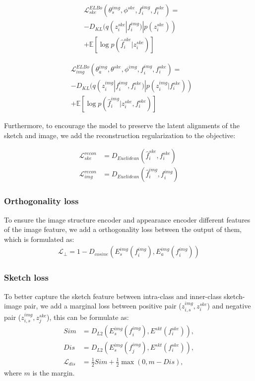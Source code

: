 \documentclass[10pt,twocolumn,letterpaper]{article}
\begin{document}
\begin{equation}
\begin{aligned}
	&\mathcal{L}_{ske}^{ELBo}(\theta_{s}^{img}, \phi^{ske}, f_{i}^{img}, f_{i}^{ske}) = \\
	&- D_{KL}(q(z_{i}^{ske}|f_{i}^{img})|p(z_{i}^{ske})) \\ 
	&+ \mathbb{E}[\log p(\hat{f}_{i}^{ske}|z_{i}^{ske})]
\end{aligned}
\end{equation}

\begin{equation}
\begin{aligned}
	&\mathcal{L}_{img}^{ELBo}(\theta_{a}^{img}, \theta^{ske}, \phi^{img}, f_{i}^{img}, f_{i}^{ske}) = \\
	&- D_{KL}(q(z_{i}^{img}|f_{i}^{img}, f_{i}^{ske})|p(z_{i}^{img}|f_{i}^{ske})) \\
	&+ \mathbb{E}[\log p(\hat{f}_{i}^{img}|z_{i}^{ske}, f_{i}^{ske})]
\end{aligned}
\end{equation}

Furthermore, to encourage the model to preserve the latent alignments of the sketch and image, we add the reconstruction regularization to the objective:

\begin{align}
	\mathcal{L}_{ske}^{recon} &= D_{Euclidean}(\hat{f}_{i}^{ske}, f_{i}^{ske}) \\
	\mathcal{L}_{img}^{recon} &= D_{Euclidean}(\hat{f}_{i}^{img}, f_{i}^{img})
\end{align}

\subsubsection{Orthogonality loss}
To ensure the image structure encoder and appearance encoder different features of the image feature, we add a orthogonality loss between the output of them, which is formulated as:
\begin{align}
	\mathcal{L}_{\perp} = 1-D_{cosine}(E_s^{img}(f_{i}^{img}), E_{a}^{img}(f_{i}^{img}))
\end{align}

\subsubsection{Sketch loss}
To better capture the sketch feature between intra-class and inner-class sketch-image pair, we add a marginal loss between positive pair ($z^{img}_{i,s}, z^{ske}_i$) and negative pair ($z^{img}_{i,s}, z^{ske}_j$), this can be formulate as:
\begin{align}
	Sim &= D_{L2}(E_s^{img}(f_{i}^{img}), E^{skt}(f_{i}^{ske})), \\
	Dis &= D_{L2}(E_s^{img}(f_{j}^{img}), E^{skt}(f_{i}^{ske})), \\
	\mathcal{L}_{dis} &= \frac{1}{2} Sim + \frac{1}{2} \max(0, m-Dis), 
\end{align}
where $m$ is the margin.
\end{document}

